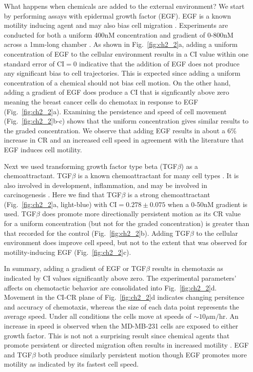 What happens when chemicals are added to the external environment? We start by performing assays with epidermal growth factor (EGF). EGF is a known motility inducing agent \cite{kim2013cooperative,mosadegh2008epidermal} and may also bias cell migration \cite{wang2004differential}. Experiments are conducted for both a uniform 400nM concentration and gradient of 0-800nM across a 1mm-long chamber .
As shown in Fig.\ \ref{fig:ch2_2}a, adding a uniform concentration of EGF to the cellular environment results in a CI value within one standard error of $\text{CI} = 0$ indicative that the addition of EGF does not produce any significant bias to cell trajectories. This is expected since adding a uniform concentration of a chemical should not bias cell motion.
On the other hand, adding a gradient of EGF does produce a CI that is signficantly above zero meaning the breast cancer cells do chemotax in response to EGF (Fig.\ \ref{fig:ch2_2}a).
Examining the persistence and speed of cell movement (Fig.\ \ref{fig:ch2_2}b-c) shows that the uniform concentration gives similar results to the graded concentration. We observe that adding EGF results in about a 6\% increase in CR and an increased cell speed in agreement with the literature that EGF induces cell motility.

Next we used transforming growth factor type beta (TGF$\beta$) as a chemoattractant. TGF$\beta$ is a known chemoattractant for many cell types \cite{wahl1987transforming,bischoff1997chemotaxis}.
It is also involved in development, inflammation, and may be involved in carcinogenesis \cite{clark1998molecules,javelaud2004mammalian,pang2016tgf}.
Here we find that TGF$\beta$ is a strong chemoattractant (Fig.\ \ref{fig:ch2_2}a, light-blue) with $\text{CI} = 0.278 \pm 0.075$ when a 0-50nM gradient is used. TGF$\beta$ does promote more directionally persistent motion as its CR value for a uniform concentration (but not for the graded concentration) is greater than that recorded for the control (Fig.\ \ref{fig:ch2_2}b). Adding TGF$\beta$ to the cellular environment does improve cell speed, but not to the extent that was observed for motility-inducing EGF (Fig.\ \ref{fig:ch2_2}c).

In summary, adding a gradient of EGF or TGF$\beta$ results in chemotaxis as indicated by CI values significantly above zero. The experimental parameters' affects on chemotactic behavior are consolidated into Fig.\ \ref{fig:ch2_2}d. Movement in the CI-CR plane of Fig.\ \ref{fig:ch2_2}d indicates changing persitence and accuracy of chemotaxis, whereas the size of each data point represents the average speed. Under all conditions the cells move at speeds of $\sim 10 \mu\text{m}/\text{hr}$. An increase in speed is observed when the MD-MB-231 cells are exposed to either growth factor. This is not not a surprising result since chemical agents that promote persistent or directed migration often results in increased motility \cite{petrie2009random}. EGF and TGF$\beta$ both produce similarly persistent motion though EGF promotes more motility as indicated by its fastest cell speed.


